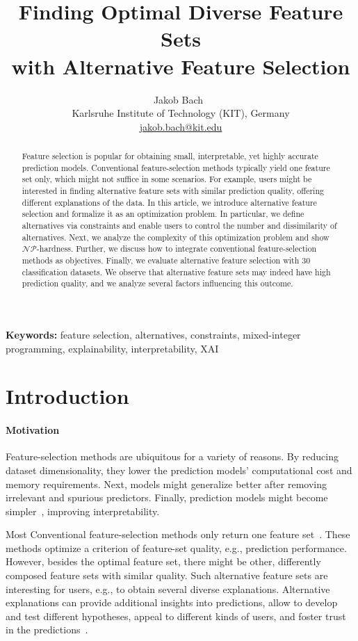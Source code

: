 \documentclass{article}
\title{
	Finding Optimal Diverse Feature Sets\texorpdfstring{\\}{ }with Alternative Feature Selection
}
\author{
	Jakob Bach~\orcidlink{0000-0003-0301-2798}\\
	\small Karlsruhe Institute of Technology (KIT), Germany\\
	\small \href{mailto:jakob.bach@kit.edu}{jakob.bach@kit.edu}
}
\date{} %
\theoremstyle{definition}
\begin{document}
\maketitle

\begin{abstract}
Feature selection is popular for obtaining small, interpretable, yet highly accurate prediction models.
Conventional feature-selection methods typically yield one feature set only, which might not suffice in some scenarios.
For example, users might be interested in finding alternative feature sets with similar prediction quality, offering different explanations of the data.
In this article, we introduce alternative feature selection and formalize it as an optimization problem.
In particular, we define alternatives via constraints and enable users to control the number and dissimilarity of alternatives.
Next, we analyze the complexity of this optimization problem and show $\mathcal{NP}$-hardness.
Further, we discuss how to integrate conventional feature-selection methods as objectives.
Finally, we evaluate alternative feature selection with 30 classification datasets.
We observe that alternative feature sets may indeed have high prediction quality, and we analyze several factors influencing this outcome.
\end{abstract}
%
\textbf{Keywords:} feature selection, alternatives, constraints, mixed-integer programming, explainability, interpretability, XAI

\section{Introduction}
\label{sec:afs:introduction}

\paragraph{Motivation}

Feature-selection methods are ubiquitous for a variety of reasons.
By reducing dataset dimensionality, they lower the prediction models' computational cost and memory requirements.
Next, models might generalize better after removing irrelevant and spurious predictors.
Finally, prediction models might become simpler~\cite{li2017feature}, improving interpretability.

Most Conventional feature-selection methods only return one feature set~\cite{borboudakis2021extending}.
These methods optimize a criterion of feature-set quality, e.g., prediction performance.
However, besides the optimal feature set, there might be other, differently composed feature sets with similar quality.
Such alternative feature sets are interesting for users, e.g., to obtain several diverse explanations.
Alternative explanations can provide additional insights into predictions, allow to develop and test different hypotheses, appeal to different kinds of users, and foster trust in the predictions~\cite{kim2021multi, wang2019designing}.
\end{document}
